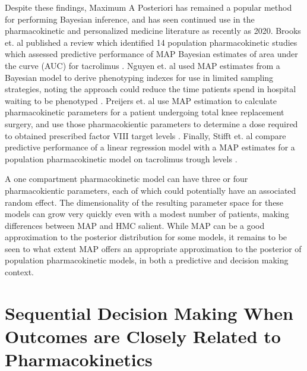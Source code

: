 Despite these findings, Maximum A Posteriori has remained a popular method for performing Bayesian inference, and has seen continued use in the pharmacokinetic and personalized medicine literature as recently as 2020. Brooks et. al \cite{Brooks2016-li} published a review which identified 14 population pharmacokinetic studies which assessed predictive performance of MAP Bayesian estimates of area under the curve (AUC) for tacrolimus  \cite{Brooks2016-li}.  Nguyen et. al used MAP estimates from a Bayesian model to derive phenotyping indexes for use in limited sampling strategies, noting the approach could reduce the time patients spend in hospital waiting to be phenotyped \cite{Nguyen2016-pg}. Preijers et. al use MAP estimation to calculate  pharmacokinetic parameters for a patient undergoing total knee replacement surgery, and use those pharmacokientic parameters to determine a dose required to obtained prescribed factor VIII target levels \cite{Preijers2019-k}.  Finally, Stifft et. al compare predictive performance of a linear regression model with a MAP estimates for a population pharmacokinetic model on tacrolimus trough levels \cite{Stifft2020-uq}.

A one compartment pharmacokinetic model can have three or four pharmacokientic parameters, each of which could potentially have an associated random effect.  The dimensionality of the resulting parameter space for these models can grow very quickly even with a modest number of patients, making differences between MAP and HMC salient.  While MAP can be a good approximation to the posterior distribution for some models, it remains to be seen to what extent MAP offers an appropriate approximation to the posterior of population pharmacokinetic models, in both a predictive and decision making context.


\section{Sequential Decision Making When Outcomes are Closely Related to Pharmacokinetics}


